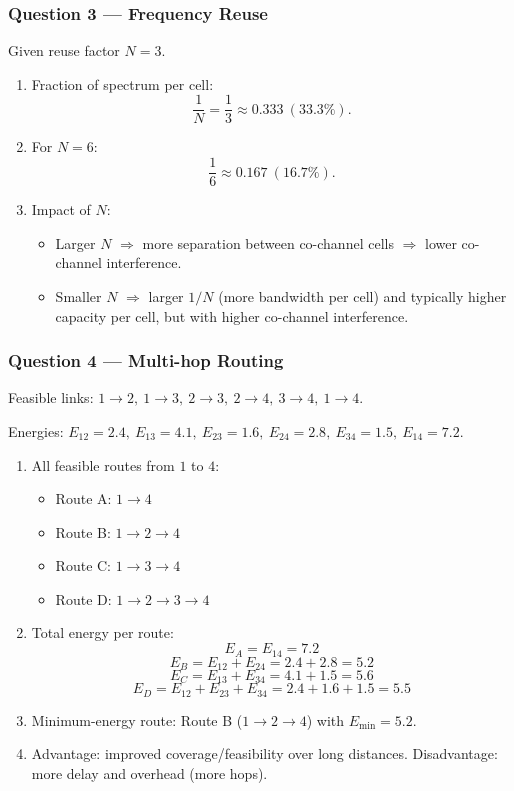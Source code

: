 \documentclass[11pt,a4paper]{article}
\begin{document}
\subsubsection*{Question 3 --- Frequency Reuse}
Given reuse factor $N=3$.

\begin{enumerate}[label=\alph*.]
    \item Fraction of spectrum per cell:
    \[
    \frac{1}{N}=\frac{1}{3}\approx 0.333\ (33.3\%).
    \]
    \item For $N=6$:
    \[
    \frac{1}{6}\approx 0.167\ (16.7\%).
    \]
    \item Impact of $N$:
    \begin{itemize}
        \item Larger $N$ $\Rightarrow$ more separation between co-channel cells $\Rightarrow$ lower co-channel interference.
        \item Smaller $N$ $\Rightarrow$ larger $1/N$ (more bandwidth per cell) and typically higher capacity per cell, but with higher co-channel interference.
    \end{itemize}
    
\end{enumerate}

\subsubsection*{Question 4 --- Multi-hop Routing}
Feasible links: $1\to 2,\ 1\to 3,\ 2\to 3,\ 2\to 4,\ 3\to 4,\ 1\to 4$.

Energies: $E_{12}=2.4,\ E_{13}=4.1,\ E_{23}=1.6,\ E_{24}=2.8,\ E_{34}=1.5,\ E_{14}=7.2$.

\begin{enumerate}[label=\alph*.]
    \item All feasible routes from $1$ to $4$:
    \begin{itemize}
        \item Route A: $1\to 4$
        \item Route B: $1\to 2\to 4$
        \item Route C: $1\to 3\to 4$
        \item Route D: $1\to 2\to 3\to 4$
    \end{itemize}
    \item Total energy per route:
    \[
    E_A=E_{14}=7.2
    \]
    \[
    E_B=E_{12}+E_{24}=2.4+2.8=5.2
    \]
    \[
    E_C=E_{13}+E_{34}=4.1+1.5=5.6
    \]
    \[
    E_D=E_{12}+E_{23}+E_{34}=2.4+1.6+1.5=5.5
    \]
    \item Minimum-energy route: Route B ($1\to 2\to 4$) with $E_{\min}=5.2$.
    \item Advantage: improved coverage/feasibility over long distances. Disadvantage: more delay and overhead (more hops).
\end{enumerate}
\end{document}
